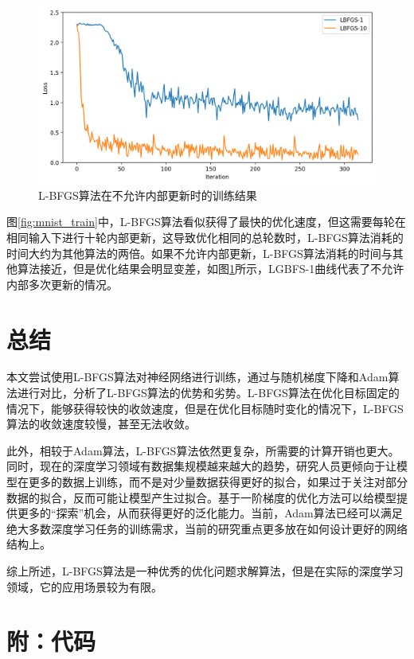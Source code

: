 \documentclass{article}
\begin{document}
\begin{figure}
    \centering
    \includegraphics[width=0.9\linewidth]{fig-mnist-limit-lbfgs.png}
    \caption{L-BFGS算法在不允许内部更新时的训练结果}
    \label{fig:mnist_limit_lbfgs}
\end{figure}

图\ref{fig:mnist_train}中，L-BFGS算法看似获得了最快的优化速度，但这需要每轮在相同输入下进行十轮内部更新，这导致优化相同的总轮数时，L-BFGS算法消耗的时间大约为其他算法的两倍。如果不允许内部更新，L-BFGS算法消耗的时间与其他算法接近，但是优化结果会明显变差，如图\ref{fig:mnist_limit_lbfgs}所示，LGBFS-1曲线代表了不允许内部多次更新的情况。

\section{总结}

本文尝试使用L-BFGS算法对神经网络进行训练，通过与随机梯度下降和Adam算法进行对比，分析了L-BFGS算法的优势和劣势。L-BFGS算法在优化目标固定的情况下，能够获得较快的收敛速度，但是在优化目标随时变化的情况下，L-BFGS算法的收敛速度较慢，甚至无法收敛。

此外，相较于Adam算法，L-BFGS算法依然更复杂，所需要的计算开销也更大。同时，现在的深度学习领域有数据集规模越来越大的趋势，研究人员更倾向于让模型在更多的数据上训练，而不是对少量数据获得更好的拟合，如果过于关注对部分数据的拟合，反而可能让模型产生过拟合。基于一阶梯度的优化方法可以给模型提供更多的“探索”机会，从而获得更好的泛化能力。当前，Adam算法已经可以满足绝大多数深度学习任务的训练需求，当前的研究重点更多放在如何设计更好的网络结构上。

综上所述，L-BFGS算法是一种优秀的优化问题求解算法，但是在实际的深度学习领域，它的应用场景较为有限。

\section*{附：代码}


\end{document}
